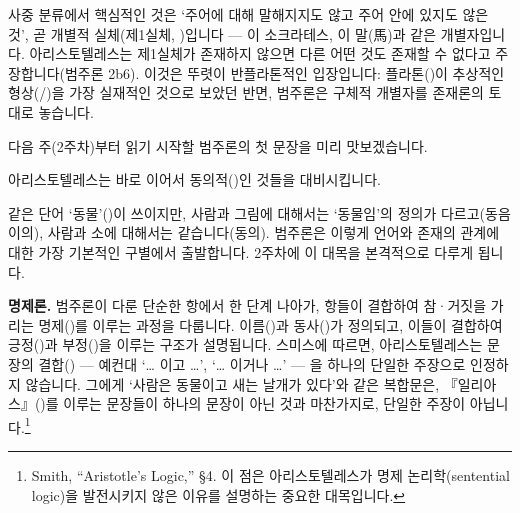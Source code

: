\documentclass[12pt, a4paper]{article}
\begin{document}
사중 분류에서 핵심적인 것은 `주어에 대해 말해지지도 않고 주어 안에 있지도 않은 것', 곧 개별적 실체(제1실체, )입니다 --- 이 소크라테스, 이 말(馬)과 같은 개별자입니다. 아리스토텔레스는 제1실체가 존재하지 않으면 다른 어떤 것도 존재할 수 없다고 주장합니다(범주론 2b6). 이것은 뚜렷이 반플라톤적인 입장입니다: 플라톤()이 추상적인 형상(/)을 가장 실재적인 것으로 보았던 반면, 범주론은 구체적 개별자를 존재론의 토대로 놓습니다.

다음 주(2주차)부터 읽기 시작할 범주론의 첫 문장을 미리 맛보겠습니다.


아리스토텔레스는 바로 이어서 동의적()인 것들을 대비시킵니다.


같은 단어 `동물'()이 쓰이지만, 사람과 그림에 대해서는 `동물임'의 정의가 다르고(동음이의), 사람과 소에 대해서는 같습니다(동의). 범주론은 이렇게 언어와 존재의 관계에 대한 가장 기본적인 구별에서 출발합니다. 2주차에 이 대목을 본격적으로 다루게 됩니다.

\textbf{명제론.} 범주론이 다룬 단순한 항에서 한 단계 나아가, 항들이 결합하여 참·거짓을 가리는 명제()를 이루는 과정을 다룹니다. 이름()과 동사()가 정의되고, 이들이 결합하여 긍정()과 부정()을 이루는 구조가 설명됩니다. 스미스에 따르면, 아리스토텔레스는 문장의 결합() --- 예컨대 `… 이고 …', `… 이거나 …' --- 을 하나의 단일한 주장으로 인정하지 않습니다. 그에게 `사람은 동물이고 새는 날개가 있다'와 같은 복합문은, 『일리아스』()를 이루는 문장들이 하나의 문장이 아닌 것과 마찬가지로, 단일한 주장이 아닙니다.\footnote{Smith, ``Aristotle's Logic,'' §4. 이 점은 아리스토텔레스가 명제 논리학(sentential logic)을 발전시키지 않은 이유를 설명하는 중요한 대목입니다.}
\end{document}
